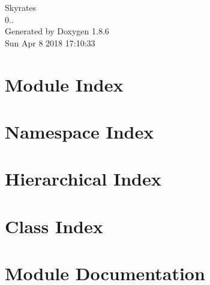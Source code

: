 \documentclass[twoside]{book}
\newcommand{\clearemptydoublepage}{%
  \newpage{\pagestyle{empty}\cleardoublepage}%
}
\begin{document}
\hypersetup{pageanchor=false}
\begin{titlepage}
\vspace*{7cm}
\begin{center}%
{\Large Skyrates \\[1ex]\large 0.. }\\
\vspace*{1cm}
{\large Generated by Doxygen 1.8.6}\\
\vspace*{0.5cm}
{\small Sun Apr 8 2018 17:10:33}\\
\end{center}
\end{titlepage}
\clearemptydoublepage
\tableofcontents
\clearemptydoublepage
{}
\hypersetup{pageanchor=true}

\chapter{Module Index}

\chapter{Namespace Index}

\chapter{Hierarchical Index}

\chapter{Class Index}

\chapter{Module Documentation}




\end{document}

